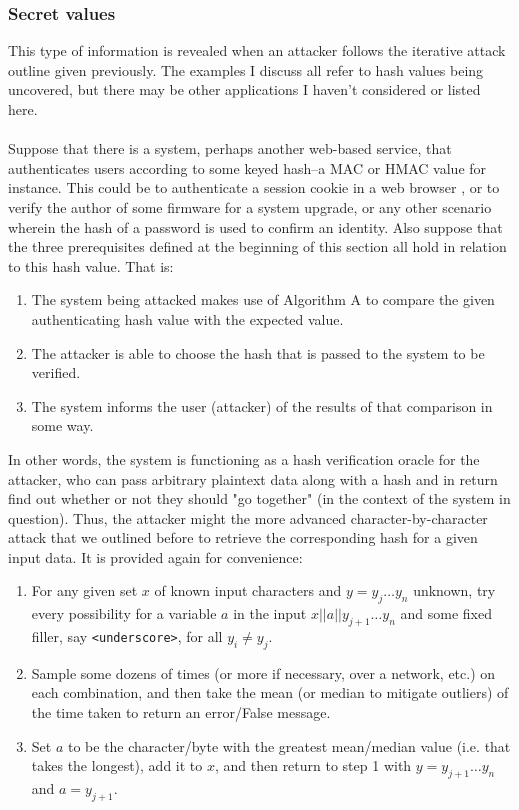 \documentclass{article}
\providecommand{\tightlist}{
    \setlength{\itemsep}{0pt}\setlength{\parskip}{0pt}
}
\providecommand{\inlinecode}{\texttt}
\begin{document}
\subsubsection{Secret values}
This type of information is revealed when an attacker follows the iterative attack outline given previously. The examples I discuss all refer to hash values being uncovered, but there may be other applications I haven't considered or listed here. \\
  \\
  Suppose that there is a system, perhaps another web-based service, that authenticates users according to some keyed hash--a MAC or HMAC value for instance. This could be to authenticate a session cookie in a web browser \cite{codahale}, or to verify the author of some firmware for a system upgrade, or any other scenario wherein the hash of a password is used to confirm an identity. Also suppose that the three prerequisites defined at the beginning of this section all hold in relation to this hash value. That is:
  \begin{enumerate}\tightlist
    \item The system being attacked makes use of Algorithm A to compare the given authenticating hash value with the expected value.
    \item The attacker is able to choose the hash that is passed to the system to be verified.
    \item The system informs the user (attacker) of the results of that comparison in some way.
  \end{enumerate}
In other words, the system is functioning as a hash verification oracle for the attacker, who can pass arbitrary plaintext data along with a hash and in return find out whether or not they should "go together" (in the context of the system in question).
Thus, the attacker might the more advanced character-by-character attack that we outlined before to retrieve the corresponding hash for a given input data. It is provided again for convenience:
\begin{enumerate}\tightlist
  \item For any given set $x$ of known input characters and $y = {y_j \dots y_n}$ unknown, try every possibility for a variable $a$ in the input $x || a || y_{j+1} \dots y_n$ and some fixed filler, say \inlinecode{<underscore>}, for all $y_i \neq y_j$.
  \item Sample some dozens of times (or more if necessary, over a network, etc.) on each combination, and then take the mean (or median to mitigate outliers) of the time taken to return an error/False message.
  \item Set $a$ to be the character/byte with the greatest mean/median value (i.e. that takes the longest), add it to $x$, and then return to step 1 with $y = {y_{j+1} \dots y_n}$ and $a = y_{j+1}$.
\end{enumerate}
\end{document}
